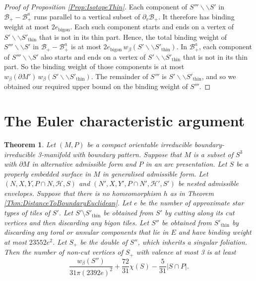 \documentclass[oneside]{amsart}
\numberwithin{equation}{section}
\theoremstyle{plain}
\newtheorem{theorem}[equation]{Theorem}
\theoremstyle{definition}
\newcommand{\cut}{\backslash\backslash}
\newcommand{\calB}{\mathcal{B}}
\begin{document}
\begin{proof}[Proof of Proposition \ref{Prop:IsotopeThin}]
Each component of  $S''' \cut S'$ in $\calB_+ - \calB_+^a$ runs 
parallel to a vertical subset of $\partial_v \calB_+$. It therefore has binding weight at most $2e_{\textrm{bigon}}$. 
Each such component starts and ends on a vertex of $S' \cut S'_{\textrm{thin}}$
that is not in its thin part. Hence, the total binding weight of $S''' \cut S'$ in $\calB_+ - \calB_+^a$ is at most $2e_{\textrm{bigon}} \, w_\beta(S' \cut S'_{\textrm{thin}})$.
In $\calB_+^a$, each component of $S''' \cut S'$ also starts and ends on a vertex of $S' \cut S'_{\textrm{thin}}$
that is not in its thin part. So the binding weight of those components is at most $w_\beta(\partial M') \, w_\beta(S' \cut S'_{\textrm{thin}})$.
The remainder of $S'''$ is $S' \cut S'_{\textrm{thin}}$, and so we obtained our required upper bound on the binding
weight of $S'''$.
\end{proof}








\section{The Euler characteristic argument}
\label{Sec:EulerCharacteristic}

\begin{theorem}
\label{Thm:NumberLowValVertices}
Let $(M,P)$ be a compact orientable irreducible boundary-irreducible 3-manifold with boundary pattern.
Suppose that $M$ is a subset of $S^3$ with $\partial M$ in alternative admissible form and $P$ in an arc presentation.
Let $S$ be a properly embedded surface in $M$ in generalised admissible form. Let $(N,X, Y, P \cap N, \mathcal{H}, S)$
and $(N',X, Y', P \cap N', \mathcal{H}', S')$ be nested admissible envelopes. Suppose that there is no homeomorphism
$h$ as in Theorem \ref{Thm:DistanceToBoundaryEuclidean}. Let $e$ be the number of approximate star types of tiles of $S'$. 
Let $S' \setminus S'_{\mathrm{thin}}$ be obtained from $S'$ by cutting along its cut vertices and then discarding any bigon tiles.
Let $S''$ be obtained from $S'_{\mathrm{thin}}$ by discarding any toral or annular components that lie in $E$ and have binding
weight at most $23552e^2$.
Let $S_+$ be the double of $S''$, which
inherits a singular foliation. Then the number
of non-cut vertices of $S_+$ with valence at most 3 is at least 
$$\frac{w_\beta(S'')}{31\pi (2392e)^2} + \frac{72}{31} \chi(S) - \frac{5}{31}|S \cap P|.$$
\end{theorem}
\end{document}

